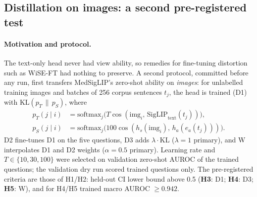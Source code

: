 \documentclass[11pt]{article}
\begin{document}
\subsection{Distillation on images: a second pre-registered test}
\label{sec:distill}

\paragraph{Motivation and protocol.} The text-only head never had view ability, so remedies for fine-tuning
distortion such as WiSE-FT \citep{wortsman2022wiseft} had nothing to preserve. A second protocol, committed before
any run, first transfers MedSigLIP's zero-shot ability on \emph{images}: for unlabelled training images and batches
of 256 corpus sentences $t_j$, the head is trained (D1) with $\mathrm{KL}(p_T\,\|\,p_S)$, where
\begin{align}
  p_T(j\mid i) &= \mathrm{softmax}_j\big(T\cos(\text{img}_i,\, \text{SigLIP}_{\text{text}}(t_j))\big), \\
  p_S(j\mid i) &= \mathrm{softmax}_j\big(100\cos(h_s(\text{img}_i),\, h_a(e_a(t_j)))\big).
\end{align} D2 fine-tunes D1 on the five questions, D3 adds
$\lambda\cdot$KL ($\lambda=1$ primary), and W interpolates D1 and D2 weights ($\alpha=0.5$ primary). Learning rate
and $T\in\{10,30,100\}$ were selected on validation zero-shot AUROC of the trained questions; the validation dry run
scored trained questions only. The pre-registered criteria are those of H1/H2: held-out CI lower bound above 0.5
(\textbf{H3}: D1; \textbf{H4}: D3; \textbf{H5}: W), and for H4/H5 trained macro AUROC $\ge 0.942$.
\end{document}
